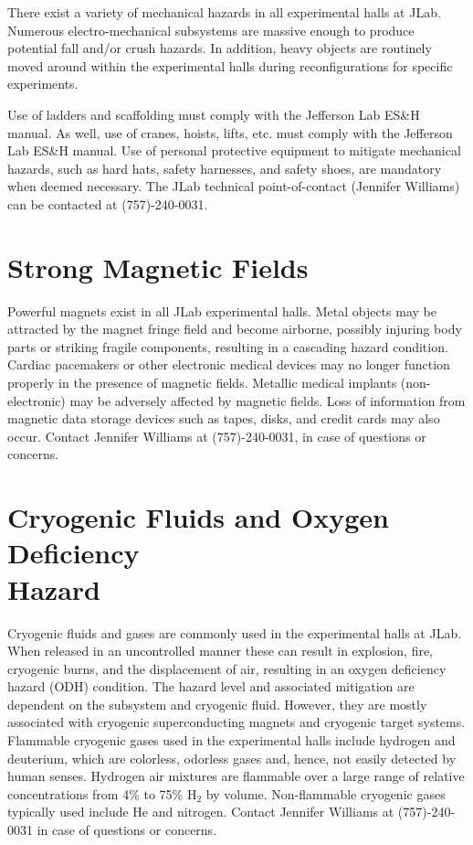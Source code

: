 \documentclass[12pt]{report}
\begin{document}
There exist a variety of mechanical hazards in all experimental halls at JLab. Numerous 
electro-mechanical subsystems are massive enough to produce potential fall and/or crush 
hazards.  In addition, heavy objects are routinely moved around within the experimental 
halls during reconfigurations for specific experiments. 

Use of ladders and scaffolding must comply with the Jefferson Lab ES\&H manual. As well,
use of cranes, hoists, lifts, etc. must comply with the Jefferson Lab ES\&H manual. Use
of personal protective equipment to mitigate mechanical hazards, 
such as hard hats, safety harnesses, and safety shoes, are mandatory when deemed necessary.
The JLab technical point-of-contact (Jennifer Williams) can be contacted at (757)-240-0031.

\section{Strong Magnetic Fields}

Powerful magnets exist in all JLab experimental halls. Metal objects may be attracted 
by the magnet fringe field and become airborne, possibly injuring body parts or striking 
fragile components, resulting in a cascading hazard condition. Cardiac pacemakers or other 
electronic medical devices may no longer function properly in the presence of magnetic 
fields. Metallic medical implants (non-electronic) may be adversely affected by magnetic 
fields. Loss of information from magnetic data storage devices such as tapes, disks, and 
credit cards may also occur. Contact Jennifer Williams at (757)-240-0031, in case of questions
or concerns.

\section{Cryogenic Fluids and Oxygen Deficiency \\Hazard}

Cryogenic fluids and gases are commonly used in the experimental halls at JLab. When 
released in an uncontrolled manner these can result in explosion, fire, cryogenic burns, 
and the displacement of air, resulting in an oxygen deficiency hazard (ODH) condition. 
The hazard level and associated mitigation are dependent on the subsystem and cryogenic 
fluid. However, they are mostly associated with cryogenic superconducting magnets and 
cryogenic target systems. Flammable cryogenic gases used in the experimental halls 
include hydrogen and deuterium, which are colorless, odorless gases and, hence, not easily 
detected by human senses. Hydrogen air mixtures are flammable over a large range of relative 
concentrations from 4\% to 75\% H$_2$ by volume. Non-flammable cryogenic gases typically 
used include He and nitrogen. Contact Jennifer Williams at (757)-240-0031 in case of questions
or concerns.
\end{document}
